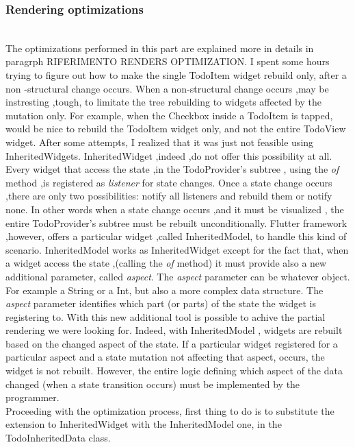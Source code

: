 \subsubsection{Rendering optimizations} \mbox{} \\
\label{subpar:render_optimizations_inherited_widget}
The optimizations performed in this part are explained more in details in paragrph RIFERIMENTO RENDERS OPTIMIZATION. I spent some hours trying to figure out how to make the single TodoItem widget rebuild only, after a non -structural change occurs. When a non-structural change occurs ,may be instresting ,tough, to limitate the tree rebuilding  to widgets affected by the mutation only. For example, when the Checkbox inside a TodoItem is tapped, would be nice to rebuild the TodoItem widget only, and not the entire TodoView widget. After some attempts, I realized that it was just not feasible using InheritedWidgets. InheritedWidget ,indeed ,do not offer this possibility at all. Every widget that access the state ,in the TodoProvider’s subtree , using the \textit{of} method ,is registered as \textit{listener} for state changes. Once a state change occurs ,there are only two possibilities: notify all listeners and rebuild them or notify none. In other words when a state change occurs ,and it must be visualized , the entire TodoProvider’s subtree must be rebuilt unconditionally. Flutter framework ,however, offers a particular widget ,called InheritedModel, to handle this kind of scenario. InheritedModel works as InheritedWidget except for the fact that, when a widget access the state ,(calling the \textit{of} method) it must provide also a new additional parameter, called \textit{aspect}. The \textit{aspect} parameter can be whatever object. For example a String or a Int, but also a more complex data structure. The \textit{aspect} parameter identifies which part (or parts) of the state the widget is registering to. 
With this new additional tool is possible to achive the partial rendering we were looking for. Indeed, with InheritedModel , widgets are rebuilt based on the changed aspect of the state. If a particular widget registered for a particular aspect and a state mutation not affecting that aspect, occurs, the widget is not rebuilt. However, the entire logic defining which aspect of the data changed (when a state transition occurs) must be implemented by the programmer.\\
Proceeding with the optimization process, first thing to do is to substitute the extension to InheritedWidget with the InheritedModel one, in the
TodoInheritedData class.
